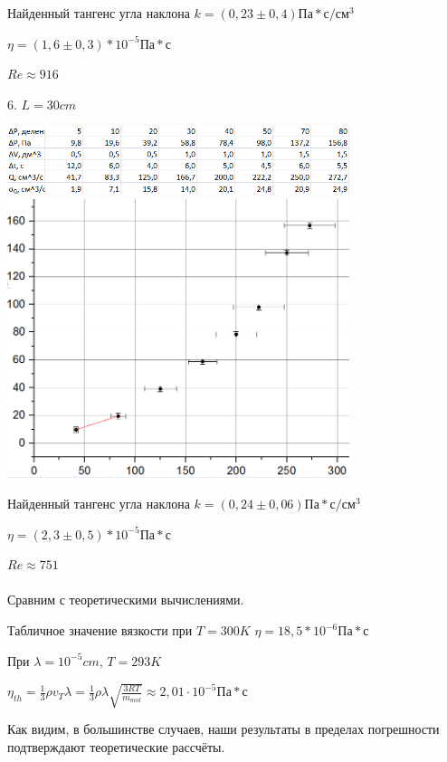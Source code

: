 \documentclass[12pt]{article}
\begin{document}
    Найденный тангенс угла наклона $k=(0,23 \pm 0,4) Па*с/см^3$
    
    $\eta = (1,6 \pm 0,3) * 10^{-5} Па*с$
    
    $Re \approx 916$
    
    6. $L = 30cm$
    
    \begin{center}
    	\includegraphics[width=10cm]{table6.png}
    	\includegraphics[width=10cm]{graph6.png}
    \end{center}
    
    Найденный тангенс угла наклона $k=(0,24 \pm 0,06) Па*с/см^3$
    
    $\eta = (2,3 \pm 0,5) * 10^{-5} Па*с$
    
    $Re \approx 751$
    \\ \\
    
    Сравним с теоретическими вычислениями. 
    
    Табличное значение вязкости при $T=300K$ $\eta = 18,5 * 10^{-6} Па*с$
    
    При $\lambda = 10^{-5} cm$, $T=293K$
    
    $\eta_{th} = \frac{1}{3} \rho v_T \lambda = \frac{1}{3} \rho \lambda \sqrt{\frac{3RT}{m_{mol}}} \approx  2,01 \cdot 10^{-5} Па*с$
    
    Как видим, в большинстве случаев, наши результаты в пределах погрешности подтверждают теоретические рассчёты.
    
\end{document}
